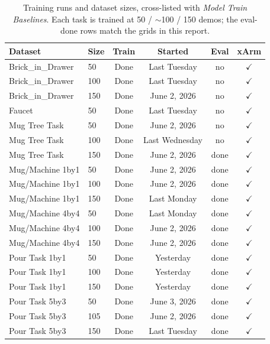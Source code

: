\documentclass[10pt]{article}
\begin{document}
\begin{table}[ht]\centering\small
\setlength{\tabcolsep}{6pt}\renewcommand{\arraystretch}{1.2}
\caption{Training runs and dataset sizes, cross-listed with \emph{Model Train Baselines}. Each task is trained at 50 / $\sim$100 / 150 demos; the eval-done rows match the grids in this report.}
\begin{tabular}{llcccc}
\toprule
\textbf{Dataset} & \textbf{Size} & \textbf{Train} & \textbf{Started} & \textbf{Eval} & \textbf{xArm} \\
\midrule
Brick\_in\_Drawer & 50 & Done & Last Tuesday & \textcolor{bad}{no} & $\checkmark$ \\
Brick\_in\_Drawer & 100 & Done & Last Tuesday & \textcolor{bad}{no} & $\checkmark$ \\
Brick\_in\_Drawer & 150 & Done & June 2, 2026 & \textcolor{bad}{no} & $\checkmark$ \\
Faucet & 50 & Done & Last Tuesday & \textcolor{bad}{no} & $\checkmark$ \\
Mug Tree Task & 50 & Done & June 2, 2026 & \textcolor{bad}{no} & $\checkmark$ \\
Mug Tree Task & 100 & Done & Last Wednesday & \textcolor{bad}{no} & $\checkmark$ \\
\rowcolor{evalbg} Mug Tree Task & 150 & Done & June 2, 2026 & \textcolor{ok}{done} & $\checkmark$ \\
\rowcolor{evalbg} Mug/Machine 1by1 & 50 & Done & June 2, 2026 & \textcolor{ok}{done} & $\checkmark$ \\
\rowcolor{evalbg} Mug/Machine 1by1 & 100 & Done & June 2, 2026 & \textcolor{ok}{done} & $\checkmark$ \\
\rowcolor{evalbg} Mug/Machine 1by1 & 150 & Done & Last Monday & \textcolor{ok}{done} & $\checkmark$ \\
\rowcolor{evalbg} Mug/Machine 4by4 & 50 & Done & Last Monday & \textcolor{ok}{done} & $\checkmark$ \\
\rowcolor{evalbg} Mug/Machine 4by4 & 100 & Done & June 2, 2026 & \textcolor{ok}{done} & $\checkmark$ \\
\rowcolor{evalbg} Mug/Machine 4by4 & 150 & Done & June 2, 2026 & \textcolor{ok}{done} & $\checkmark$ \\
\rowcolor{evalbg} Pour Task 1by1 & 50 & Done & Yesterday & \textcolor{ok}{done} & $\checkmark$ \\
\rowcolor{evalbg} Pour Task 1by1 & 100 & Done & Yesterday & \textcolor{ok}{done} & $\checkmark$ \\
\rowcolor{evalbg} Pour Task 1by1 & 150 & Done & Yesterday & \textcolor{ok}{done} & $\checkmark$ \\
\rowcolor{evalbg} Pour Task 5by3 & 50 & Done & June 3, 2026 & \textcolor{ok}{done} & $\checkmark$ \\
\rowcolor{evalbg} Pour Task 5by3 & 105 & Done & June 2, 2026 & \textcolor{ok}{done} & $\checkmark$ \\
\rowcolor{evalbg} Pour Task 5by3 & 150 & Done & Last Tuesday & \textcolor{ok}{done} & $\checkmark$ \\
\bottomrule
\end{tabular}
\end{table}
\end{document}
